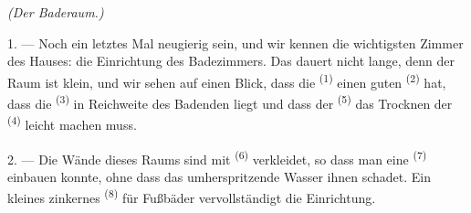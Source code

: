 \VUsaut{4.0mm}
{\centering\fontsize{10.2pt}{10.2pt}\selectfont{} \textit{(Der Baderaum.)}\par}
\VUsaut{3.0mm}

1. --- Noch ein letztes Mal neugierig sein, und wir kennen die wichtigsten Zimmer
des Hauses: die Einrichtung des Badezimmers. Das dauert nicht lange, denn der Raum
ist klein, und wir sehen auf einen Blick, dass die 
\textsuperscript{(1)} einen guten  \textsuperscript{(2)} hat, dass
die  \textsuperscript{(3)} in Reichweite des Badenden liegt und
dass der  \textsuperscript{(5)} das Trocknen der
 \textsuperscript{(4)} leicht machen muss.

2. --- Die Wände dieses Raums sind mit 
\textsuperscript{(6)} verkleidet, so dass man eine 
\textsuperscript{(7)} einbauen konnte, ohne dass das umherspritzende Wasser ihnen
schadet. Ein kleines zinkernes  \textsuperscript{(8)} für Fußbäder
vervollständigt die Einrichtung.
\VUsaut{6.0mm}
\VUfilet{22mm}

